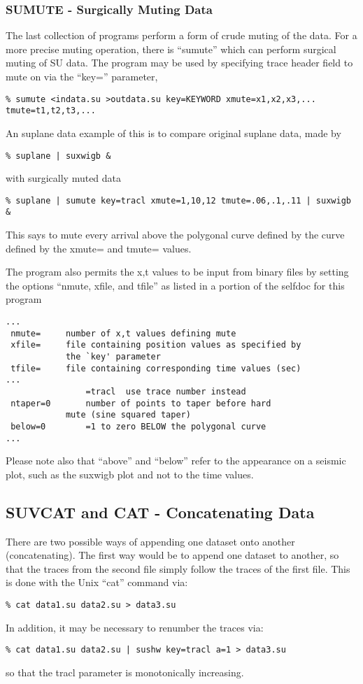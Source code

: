 {{{{{{{\subsubsection{SUMUTE - Surgically Muting Data}
The last collection of programs perform a form of crude muting of
the data.
For a more precise muting operation, there is ``sumute''
which can perform surgical muting of SU data.
The program may be used by specifying trace header field
to mute on via the ``key='' parameter,
{\small\begin{verbatim}
% sumute <indata.su >outdata.su key=KEYWORD xmute=x1,x2,x3,... tmute=t1,t2,t3,... 		
\end{verbatim}} \noindent
An suplane data example of this is to compare
original suplane data, made by
{\small\begin{verbatim}
% suplane | suxwigb &
\end{verbatim}} \noindent
with surgically muted data
{\small\begin{verbatim}
% suplane | sumute key=tracl xmute=1,10,12 tmute=.06,.1,.11 | suxwigb &
\end{verbatim} } \noindent
This says to mute every arrival above the polygonal curve defined
by the curve defined by the xmute= and  tmute= values.

The program also permits the x,t values to be input from binary
files by setting the options ``nmute, xfile, and tfile''
as listed in a portion of the selfdoc for this program
{\small\begin{verbatim}
...
 nmute=		number of x,t values defining mute		
 xfile=		file containing position values as specified by	
 			the `key' parameter				
 tfile=		file containing corresponding time values (sec)	
...
 				=tracl  use trace number instead	
 ntaper=0		number of points to taper before hard		
			mute (sine squared taper)			
 below=0		=1 to zero BELOW the polygonal curve		
...
\end{verbatim} } \noindent
Please note also that ``above'' and ``below'' refer to the appearance
on a seismic plot, such as the suxwigb plot and not to the time
values.

\subsection{SUVCAT and CAT - Concatenating Data}
There are two possible ways of appending one dataset onto another
(concatenating). The first way would be to append one dataset
to another, so that the traces from the second file simply follow
the traces of the first file. This is done with the Unix ``cat''
command via:
{\small\begin{verbatim}
% cat data1.su data2.su > data3.su
\end{verbatim}} \noindent
In addition, it may be necessary to renumber the traces via:
{\small\begin{verbatim}
% cat data1.su data2.su | sushw key=tracl a=1 > data3.su
\end{verbatim}} \noindent
so that the tracl parameter is monotonically increasing.

}}}}}}}
